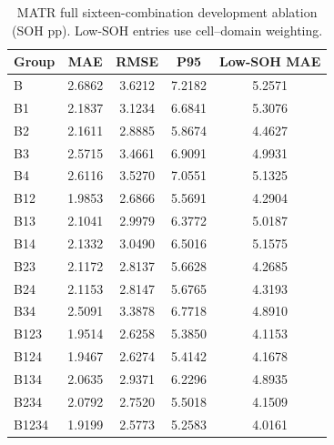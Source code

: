 \begin{table}[!htbp]
\centering
\caption{MATR full sixteen-combination development ablation (SOH pp). Low-SOH entries use cell--domain weighting.}
\label{tab:allablMATR}
\footnotesize
\setlength{\tabcolsep}{4pt}
\begin{tabular}{lcccc}
\toprule
Group & MAE & RMSE & P95 & Low-SOH MAE \\
\midrule
B & 2.6862 & 3.6212 & 7.2182 & 5.2571 \\
B1 & 2.1837 & 3.1234 & 6.6841 & 5.3076 \\
B2 & 2.1611 & 2.8885 & 5.8674 & 4.4627 \\
B3 & 2.5715 & 3.4661 & 6.9091 & 4.9931 \\
B4 & 2.6116 & 3.5270 & 7.0551 & 5.1325 \\
B12 & 1.9853 & 2.6866 & 5.5691 & 4.2904 \\
B13 & 2.1041 & 2.9979 & 6.3772 & 5.0187 \\
B14 & 2.1332 & 3.0490 & 6.5016 & 5.1575 \\
B23 & 2.1172 & 2.8137 & 5.6628 & 4.2685 \\
B24 & 2.1153 & 2.8147 & 5.6765 & 4.3193 \\
B34 & 2.5091 & 3.3878 & 6.7718 & 4.8910 \\
B123 & 1.9514 & 2.6258 & 5.3850 & 4.1153 \\
B124 & 1.9467 & 2.6274 & 5.4142 & 4.1678 \\
B134 & 2.0635 & 2.9371 & 6.2296 & 4.8935 \\
B234 & 2.0792 & 2.7520 & 5.5018 & 4.1509 \\
B1234 & 1.9199 & 2.5773 & 5.2583 & 4.0161 \\
\bottomrule
\end{tabular}
\end{table}

